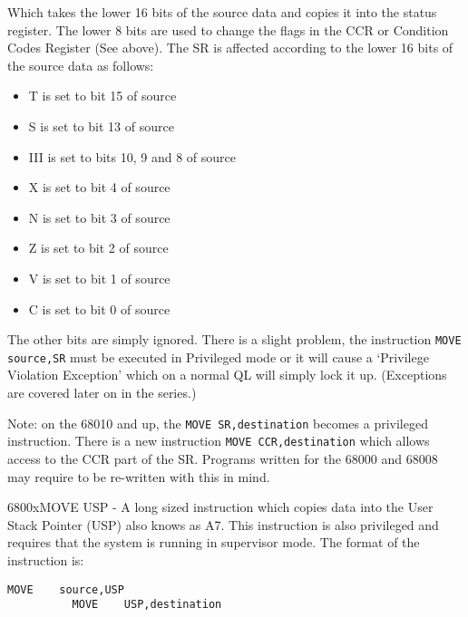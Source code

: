 Which takes the lower 16 bits of the source data and copies it into
    the status register. The lower 8 bits are used to change the flags in the
    CCR or Condition Codes Register (See  above). The SR is affected
    according to the lower 16 bits of the source data as follows:
\begin{itemize}[itemsep=0pt]

\item{}T is set to bit 15 of source


\item{}S is set to bit 13 of source


\item{}III is set to bits 10, 9 and 8 of source


\item{}X is set to bit 4 of source


\item{}N is set to bit 3 of source


\item{}Z is set to bit 2 of source


\item{}V is set to bit 1 of source


\item{}C is set to bit 0 of source

\end{itemize}

The other bits are simply ignored. There is a slight problem, the
    instruction \lstinline{MOVE source,SR} must be executed in Privileged mode or it will
    cause a `Privilege Violation Exception' which on a normal QL will simply
    lock it up. (Exceptions are covered later on in the series.)

\begin{warning}
Note: on the 68010 and up, the \lstinline{MOVE SR,destination} becomes a
      privileged instruction. There is a new instruction \lstinline{MOVE CCR,destination}
      which allows access to the CCR part of the SR. Programs written for the
      68000 and 68008 may require to be re-{}written with this in mind.
\end{warning}

\mc6800x{MOVE USP} -{} A long sized instruction which copies data into the User
    Stack Pointer (USP) also knows as A7. This instruction is also privileged
    and requires that the system is running in supervisor mode. The format of
    the instruction is:

\begin{lstlisting}[firstnumber=1,]
          MOVE    source,USP 
          MOVE    USP,destination
\end{lstlisting}

